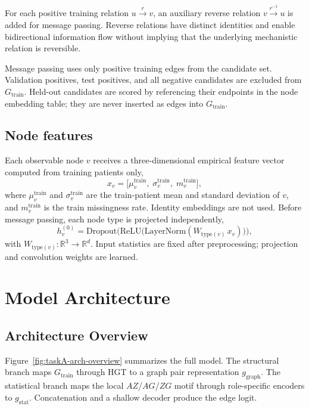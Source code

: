 For each positive training relation $u\xrightarrow{r}v$, an auxiliary reverse relation $v\xrightarrow{r^{-1}}u$ is added for message passing.
Reverse relations have distinct identities and enable bidirectional information flow without implying that the underlying mechanistic relation is reversible.

Message passing uses only positive training edges from the candidate set.
Validation positives, test positives, and all negative candidates are excluded from $G_{\mathrm{train}}$.
Held-out candidates are scored by referencing their endpoints in the node embedding table; they are never inserted as edges into $G_{\mathrm{train}}$.

\subsection{Node features}
\label{sec:taskA-node-feats}

Each observable node $v$ receives a three-dimensional empirical feature vector computed from training patients only,
\begin{equation}
\label{eq:taskA-node-x}
x_v=
\bigl[
\mu^{\mathrm{train}}_v,\;
\sigma^{\mathrm{train}}_v,\;
m^{\mathrm{train}}_v
\bigr],
\end{equation}
where $\mu^{\mathrm{train}}_v$ and $\sigma^{\mathrm{train}}_v$ are the train-patient mean and standard deviation of $v$, and $m^{\mathrm{train}}_v$ is the train missingness rate.
Identity embeddings are not used.
Before message passing, each node type is projected independently,
\begin{equation}
\label{eq:taskA-input-proj}
h_v^{(0)}=\mathrm{Dropout}\!\bigl(
\mathrm{ReLU}\bigl(
\mathrm{LayerNorm}(W_{\mathrm{type}(v)}\,x_v)
\bigr)\bigr),
\end{equation}
with $W_{\mathrm{type}(v)}:\mathbb{R}^{3}\to\mathbb{R}^{d}$.
Input statistics are fixed after preprocessing; projection and convolution weights are learned.

\section{Model Architecture}
\label{sec:taskA-arch}

\subsection{Architecture Overview}
\label{sec:taskA-arch-overview}

Figure~\ref{fig:taskA-arch-overview} summarizes the full model.
The structural branch maps $G_{\mathrm{train}}$ through HGT to a graph pair representation $g_{\mathrm{graph}}$.
The statistical branch maps the local $AZ$/$AG$/$ZG$ motif through role-specific encoders to $g_{\mathrm{stat}}$.
Concatenation and a shallow decoder produce the edge logit.

